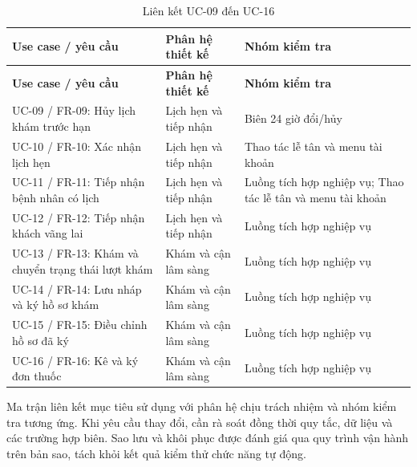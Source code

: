 \clearpage

{\small\setlength{\tabcolsep}{3pt}\renewcommand{\arraystretch}{1.12}
\begin{longtable}{@{}L{\textwidth-4.8pt\relax} L{\textwidth-3.24pt\relax} L{\textwidth-3.96pt\relax}@{}}
\caption{Liên kết UC-09 đến UC-16}\\
\toprule
\textbf{Use case /\allowbreak{} yêu cầu} & \textbf{Phân hệ thiết kế} & \textbf{Nhóm kiểm tra}\\\midrule
\endfirsthead
\toprule
\textbf{Use case /\allowbreak{} yêu cầu} & \textbf{Phân hệ thiết kế} & \textbf{Nhóm kiểm tra}\\\midrule
\endhead
\bottomrule\endlastfoot
UC-09 /\allowbreak{} FR-09:\allowbreak{} Hủy lịch khám trước hạn & Lịch hẹn và tiếp nhận & Biên 24 giờ đổi/\allowbreak{}hủy\\[3pt]
UC-10 /\allowbreak{} FR-10:\allowbreak{} Xác nhận lịch hẹn & Lịch hẹn và tiếp nhận & Thao tác lễ tân và menu tài khoản\\[3pt]
UC-11 /\allowbreak{} FR-11:\allowbreak{} Tiếp nhận bệnh nhân có lịch & Lịch hẹn và tiếp nhận & Luồng tích hợp nghiệp vụ; Thao tác lễ tân và menu tài khoản\\[3pt]
UC-12 /\allowbreak{} FR-12:\allowbreak{} Tiếp nhận khách vãng lai & Lịch hẹn và tiếp nhận & Luồng tích hợp nghiệp vụ\\[3pt]
UC-13 /\allowbreak{} FR-13:\allowbreak{} Khám và chuyển trạng thái lượt khám & Khám và cận lâm sàng & Luồng tích hợp nghiệp vụ\\[3pt]
UC-14 /\allowbreak{} FR-14:\allowbreak{} Lưu nháp và ký hồ sơ khám & Khám và cận lâm sàng & Luồng tích hợp nghiệp vụ\\[3pt]
UC-15 /\allowbreak{} FR-15:\allowbreak{} Điều chỉnh hồ sơ đã ký & Khám và cận lâm sàng & Luồng tích hợp nghiệp vụ\\[3pt]
UC-16 /\allowbreak{} FR-16:\allowbreak{} Kê và ký đơn thuốc & Khám và cận lâm sàng & Luồng tích hợp nghiệp vụ\\[3pt]
\end{longtable}}
Ma trận liên kết mục tiêu sử dụng với phân hệ chịu trách nhiệm và nhóm kiểm tra tương ứng.\allowbreak{} Khi yêu cầu thay đổi, cần rà soát đồng thời quy tắc, dữ liệu và các trường hợp biên.\allowbreak{} Sao lưu và khôi phục được đánh giá qua quy trình vận hành trên bản sao, tách khỏi kết quả kiểm thử chức năng tự động.\allowbreak{}

\clearpage

